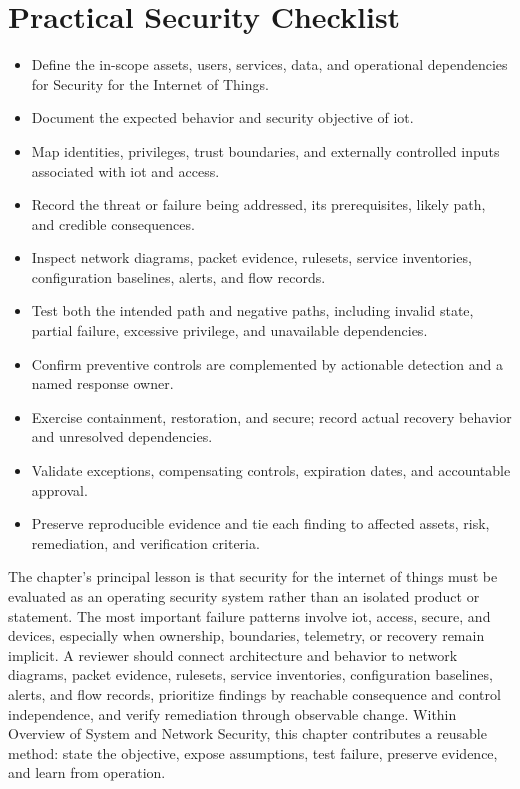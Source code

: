 \documentclass[11pt]{article}
\begin{document}
\section*{Practical Security Checklist}
\begin{itemize}[label=$\square$]
\item Define the in-scope assets, users, services, data, and operational dependencies for Security for the Internet of Things.
\item Document the expected behavior and security objective of iot.
\item Map identities, privileges, trust boundaries, and externally controlled inputs associated with iot and access.
\item Record the threat or failure being addressed, its prerequisites, likely path, and credible consequences.
\item Inspect network diagrams, packet evidence, rulesets, service inventories, configuration baselines, alerts, and flow records.
\item Test both the intended path and negative paths, including invalid state, partial failure, excessive privilege, and unavailable dependencies.
\item Confirm preventive controls are complemented by actionable detection and a named response owner.
\item Exercise containment, restoration, and secure; record actual recovery behavior and unresolved dependencies.
\item Validate exceptions, compensating controls, expiration dates, and accountable approval.
\item Preserve reproducible evidence and tie each finding to affected assets, risk, remediation, and verification criteria.
\end{itemize}
\begin{synthesisbox}
The chapter's principal lesson is that security for the internet of things must be evaluated as an operating security system rather than an isolated product or statement. The most important failure patterns involve iot, access, secure, and devices, especially when ownership, boundaries, telemetry, or recovery remain implicit. A reviewer should connect architecture and behavior to network diagrams, packet evidence, rulesets, service inventories, configuration baselines, alerts, and flow records, prioritize findings by reachable consequence and control independence, and verify remediation through observable change. Within Overview of System and Network Security, this chapter contributes a reusable method: state the objective, expose assumptions, test failure, preserve evidence, and learn from operation.
\end{synthesisbox}
\end{document}
